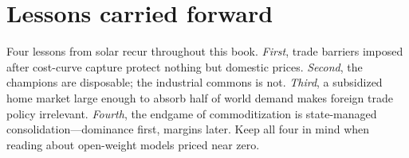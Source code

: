 \section{Lessons carried forward}

Four lessons from solar recur throughout this book. \emph{First}, trade barriers imposed after cost-curve capture protect nothing but domestic prices. \emph{Second}, the champions are disposable; the industrial commons is not. \emph{Third}, a subsidized home market large enough to absorb half of world demand makes foreign trade policy irrelevant. \emph{Fourth}, the endgame of commoditization is state-managed consolidation---dominance first, margins later. Keep all four in mind when reading about open-weight models priced near zero.
